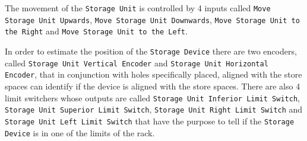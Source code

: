 The movement of the \verb|Storage Unit| is controlled by 4 inputs called \linebreak
\verb|Move Storage Unit Upwards|, \verb|Move Storage Unit Downwards|, \newline
\verb|Move Storage Unit to the Right| and
\verb|Move Storage Unit to the Left|.

In order to estimate the position of the \verb|Storage Device|  there are two
encoders, called \verb|Storage Unit Vertical Encoder| and
\verb|Storage Unit Horizontal Encoder|, that in conjunction with holes
specifically placed, aligned with the store spaces can identify if the device is
aligned with the store spaces. There are also 4 limit switchers  whose outputs
are called
\verb|Storage Unit Inferior Limit Switch|,
\verb|Storage Unit Superior Limit Switch|,
\verb|Storage Unit Right Limit Switch| and
\verb|Storage Unit Left Limit Switch| that have the purpose to tell if the
\verb|Storage Device| is in one of the limits of the rack.


